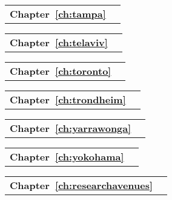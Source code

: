 \begin{tabular}[width=0.48\textwidth]{@{}l l}
\textbf{Chapter~\ref{ch:tampa}} &  \\
\end{tabular}

\begin{tabular}[width=0.48\textwidth]{@{}l l}
\textbf{Chapter~\ref{ch:telaviv}} &  \\
\end{tabular}

\begin{tabular}[width=0.48\textwidth]{@{}l l}
\textbf{Chapter~\ref{ch:toronto}} &  \\
\end{tabular}

\begin{tabular}[width=0.48\textwidth]{@{}l l}
\textbf{Chapter~\ref{ch:trondheim}} &  \\
\end{tabular}

\begin{tabular}[width=0.48\textwidth]{@{}l l}
\textbf{Chapter~\ref{ch:yarrawonga}} &  \\
\end{tabular}

\begin{tabular}[width=0.48\textwidth]{@{}l l}
\textbf{Chapter~\ref{ch:yokohama}} &  \\
\end{tabular}

\begin{tabular}[width=0.48\textwidth]{@{}l l}
\textbf{Chapter~\ref{ch:researchavenues}} &  \\
\end{tabular}

